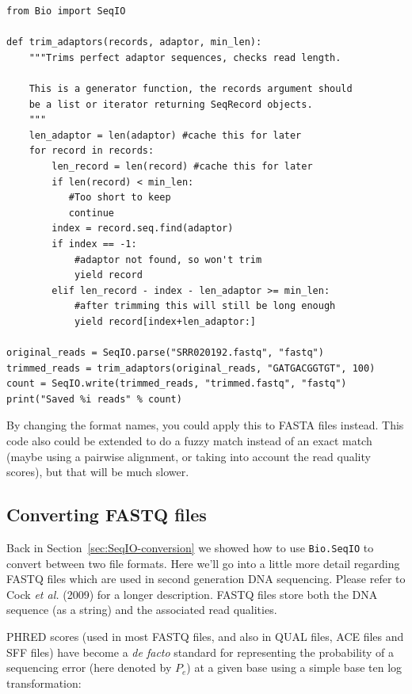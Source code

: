 \documentclass{report}
\begin{document}
\begin{verbatim}
from Bio import SeqIO

def trim_adaptors(records, adaptor, min_len):
    """Trims perfect adaptor sequences, checks read length.
    
    This is a generator function, the records argument should
    be a list or iterator returning SeqRecord objects.
    """
    len_adaptor = len(adaptor) #cache this for later
    for record in records:
        len_record = len(record) #cache this for later
        if len(record) < min_len:
           #Too short to keep
           continue
        index = record.seq.find(adaptor)
        if index == -1:
            #adaptor not found, so won't trim
            yield record
        elif len_record - index - len_adaptor >= min_len:
            #after trimming this will still be long enough
            yield record[index+len_adaptor:]

original_reads = SeqIO.parse("SRR020192.fastq", "fastq")
trimmed_reads = trim_adaptors(original_reads, "GATGACGGTGT", 100)
count = SeqIO.write(trimmed_reads, "trimmed.fastq", "fastq") 
print("Saved %i reads" % count)
\end{verbatim}

By changing the format names, you could apply this to FASTA files instead.
This code also could be extended to do a fuzzy match instead of an exact
match (maybe using a pairwise alignment, or taking into account the read
quality scores), but that will be much slower.

\subsection{Converting FASTQ files}
\label{sec:SeqIO-fastq-conversion}

Back in Section~\ref{sec:SeqIO-conversion} we showed how to use
\verb|Bio.SeqIO| to convert between two file formats. Here we'll go into a
little more detail regarding FASTQ files which are used in second generation
DNA sequencing. Please refer to Cock \textit{et al.} (2009) \cite{cock2010}
for a longer description. FASTQ files store both the DNA sequence (as a string)
and the associated read qualities. 

PHRED scores (used in most FASTQ files, and also in QUAL files, ACE files
and SFF files) have become a \textit{de facto} standard for representing
the probability of a sequencing error (here denoted by $P_e$) at a given
base using a simple base ten log transformation:
\end{document}
